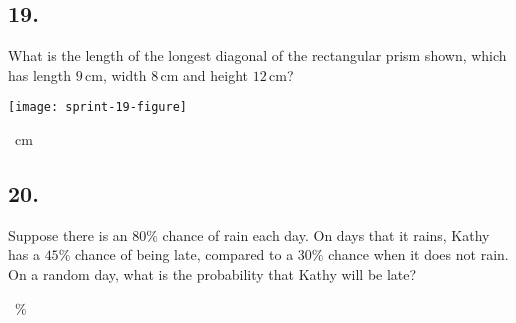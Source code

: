 \documentclass[12pt]{article}
\begin{document}
\subsection*{19.}
What is the length of the longest diagonal of the rectangular prism shown, which has length $9$\,cm, width $8$\,cm and height $12$\,cm?

\begin{minipagex}[b]{\linewidth}
\centering
\texttt{[image: sprint-19-figure]}
\end{minipagex}

\nopagebreak

\fbox{\phantom{ANSWER}}~cm

\begin{answer}
%
\end{answer}


\subsection*{20.}
Suppose there is an $80\%$ chance of rain each day. On days that it rains, Kathy has a $45\%$ chance of being late, compared to a $30\%$ chance when it does not rain. On a random day, what is the probability that Kathy will be late?

\nopagebreak

\fbox{\phantom{ANSWER}}~\%

\begin{answer}
%
\end{answer}
\end{document}
